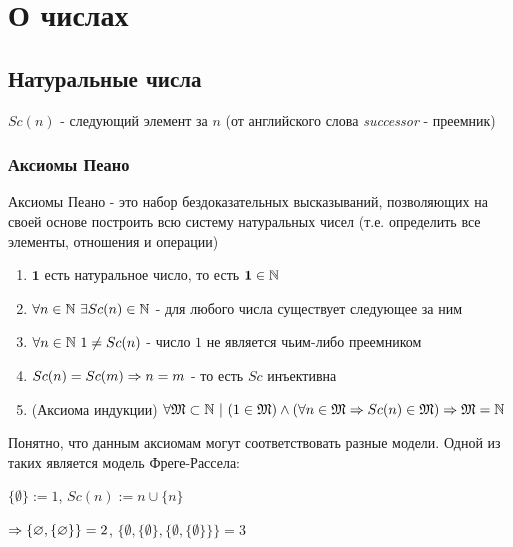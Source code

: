 \section{О числах}

\subsection{Натуральные числа}

\begin{definition}
    $Sc(n)$ - следующий элемент за $n$ (от английского слова \textit{successor} - преемник)
\end{definition}

\subsubsection{Аксиомы Пеано}

\begin{definition}
    Аксиомы Пеано - это набор бездоказательных высказываний, позволяющих на своей основе построить всю систему натуральных чисел (т.е. определить все элементы, отношения и операции)
\end{definition}

\begin{enumerate}
    \item $\mathbf{1}$ есть натуральное число, то есть $\mathbf{1} \in \mathbb{N}$
    \item $\forall n \in \mathbb{N}\ \exists Sc(n) \in \mathbb{N}$ - для любого числа существует следующее за ним
    \item $\forall n \in \mathbb{N}\ 1 \neq Sc(n)$ - число $1$ не является чьим-либо преемником
    \item $Sc(n) = Sc(m) \Rightarrow n = m$ - то есть $Sc$ инъективна
    \item (Аксиома индукции) $\forall \mathfrak{M} \subset \mathbb{N}\ |\ (1 \in \mathfrak{M}) \wedge (\forall n \in \mathfrak{M} \Rightarrow Sc(n) \in \mathfrak{M}) \Rightarrow \mathfrak{M} = \mathbb{N}$
\end{enumerate}

\begin{example}
    Понятно, что данным аксиомам могут соответствовать разные модели. Одной из таких является модель Фреге-Рассела:
    
    $\{\emptyset\} := 1$, $Sc(n) := n \cup \{n\}$
    
    $\Rightarrow \{\varnothing, \{\varnothing\}\} = 2$, $\{\emptyset, \{\emptyset\}, \{\emptyset, \{\emptyset\}\}\} = 3$
\end{example}

